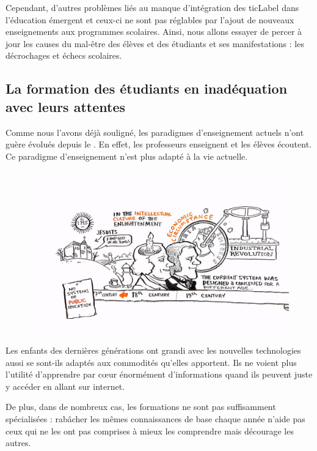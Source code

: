 Cependant, d'autres problèmes liés au manque d'intégration des \gls{ticLabel} dans l'éducation émergent et ceux-ci ne sont pas réglables par l'ajout de nouveaux enseignements aux programmes scolaires. Ainsi, nous allons essayer de percer à jour les causes du mal-être des élèves et des étudiants et ses manifestations : les décrochages et échecs scolaires.

\subsection{La formation des étudiants en inadéquation avec leurs attentes}
Comme nous l'avons déjà souligné, les paradigmes d'enseignement actuels n'ont guère évolués depuis le  \cite{robinson2010paradigms}. En effet, les professeurs enseignent et les élèves écoutent. Ce paradigme d'enseignement n'est plus adapté à la vie actuelle.

\begin{figure}[h]
\centering
\includegraphics[trim=2cm 1.5cm 0cm 1.5cm, clip=true, width=\linewidth]{../resources/illustrations/public_education}
\end{figure}

Les enfants des dernières générations ont grandi avec les nouvelles technologies aussi se sont-ils adaptés aux commodités qu'elles apportent. Ils ne voient plus l'utilité d'apprendre par cœur énormément d'informations quand ils peuvent juste y accéder en allant sur internet.

De plus, dans de nombreux cas, les formations ne sont pas suffisamment spécialisées : rabâcher les mêmes connaissances de base chaque année n'aide pas ceux qui ne les ont pas comprises à mieux les comprendre mais décourage les autres.

